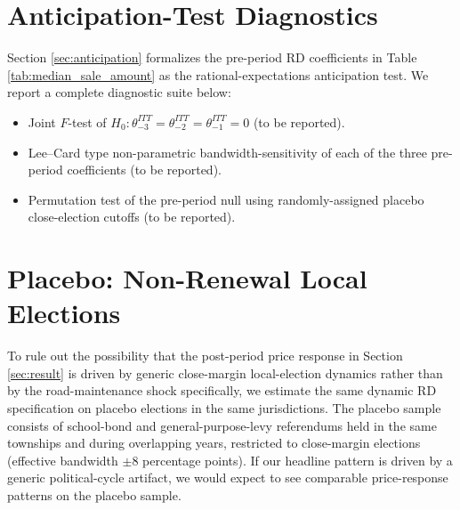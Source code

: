 
\section{Anticipation-Test Diagnostics}

Section \ref{sec:anticipation} formalizes the pre-period RD coefficients in Table \ref{tab:median_sale_amount} as the rational-expectations anticipation test. We report a complete diagnostic suite below:

\begin{itemize}
\item Joint $F$-test of $H_0: \theta^{ITT}_{-3} = \theta^{ITT}_{-2} = \theta^{ITT}_{-1} = 0$ (to be reported).
\item Lee--Card type non-parametric bandwidth-sensitivity of each of the three pre-period coefficients (to be reported).
\item Permutation test of the pre-period null using randomly-assigned placebo close-election cutoffs (to be reported).
\end{itemize}


\section{Placebo: Non-Renewal Local Elections}

To rule out the possibility that the post-period price response in Section \ref{sec:result} is driven by generic close-margin local-election dynamics rather than by the road-maintenance shock specifically, we estimate the same dynamic RD specification on placebo elections in the same jurisdictions. The placebo sample consists of school-bond and general-purpose-levy referendums held in the same townships and during overlapping years, restricted to close-margin elections (effective bandwidth $\pm 8$ percentage points). If our headline pattern is driven by a generic political-cycle artifact, we would expect to see comparable price-response patterns on the placebo sample.


